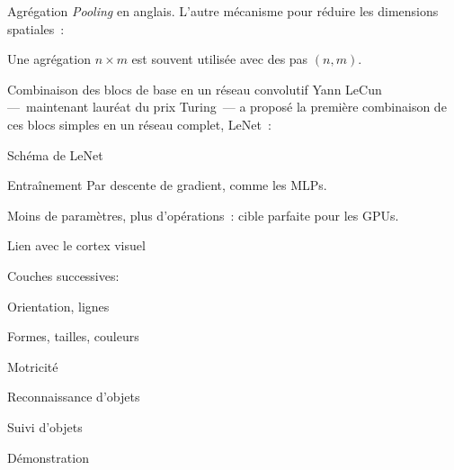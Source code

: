 \begin{frame}{Agrégation}
  \textit{Pooling} en anglais. L'autre mécanisme pour réduire les dimensions spatiales~:


  Une agrégation $n \times m$ est souvent utilisée avec des pas $(n, m)$.
\end{frame}

\begin{frame}{Combinaison des blocs de base en un réseau convolutif}
  Yann LeCun ---~maintenant lauréat du prix Turing~--- a proposé la première combinaison de ces blocs simples en un réseau complet, LeNet~:

\end{frame}

\begin{frame}{Schéma de LeNet}
\end{frame}

\begin{frame}{Entraînement}
  Par descente de gradient, comme les MLPs.

  Moins de paramètres, plus d'opérations~: cible parfaite pour les GPUs.

\end{frame}

\begin{frame}{Lien avec le cortex visuel}
  \begin{minipage}[l]{0.50\linewidth}
  \end{minipage}\hfill
  \begin{minipage}[l]{0.49\linewidth}
    Couches successives:
    \begin{description}[<+(1)->]
    \item[V1] Orientation, lignes
    \item[V2] Formes, tailles, couleurs
    \item[V3] Motricité
    \item[V4] Reconnaissance d'objets
    \item[V5] Suivi d'objets
    \end{description}
  \end{minipage}\hfill
\end{frame}

\begin{frame}{Démonstration}
\end{frame}
